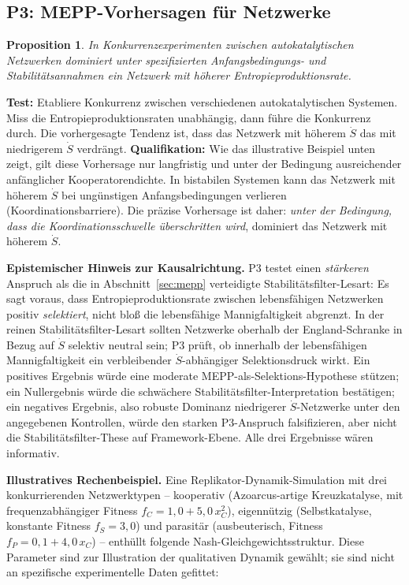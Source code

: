 \documentclass[12pt,a4paper]{article}
\newtheorem{proposition}{Proposition}
\theoremstyle{remark}
\begin{document}
\subsection{P3: MEPP-Vorhersagen für Netzwerke}

\begin{proposition}
In Konkurrenzexperimenten zwischen autokatalytischen Netzwerken dominiert unter spezifizierten Anfangsbedingungs- und Stabilitätsannahmen ein Netzwerk mit höherer Entropieproduktionsrate.
\end{proposition}

\textbf{Test:} Etabliere Konkurrenz zwischen verschiedenen autokatalytischen Systemen. Miss die Entropieproduktionsraten unabhängig, dann führe die Konkurrenz durch. Die vorhergesagte Tendenz ist, dass das Netzwerk mit höherem $\dot{S}$ das mit niedrigerem $\dot{S}$ verdrängt. \textbf{Qualifikation:} Wie das illustrative Beispiel unten zeigt, gilt diese Vorhersage nur langfristig und unter der Bedingung ausreichender anfänglicher Kooperatorendichte. In bistabilen Systemen kann das Netzwerk mit höherem $\dot{S}$ bei ungünstigen Anfangsbedingungen verlieren (Koordinationsbarriere). Die präzise Vorhersage ist daher: \emph{unter der Bedingung, dass die Koordinationsschwelle überschritten wird}, dominiert das Netzwerk mit höherem $\dot{S}$.

\textbf{Epistemischer Hinweis zur Kausalrichtung.} P3 testet einen \emph{stärkeren} Anspruch als die in Abschnitt~\ref{sec:mepp} verteidigte Stabilitätsfilter-Lesart: Es sagt voraus, dass Entropieproduktionsrate zwischen lebensfähigen Netzwerken positiv \emph{selektiert}, nicht bloß die lebensfähige Mannigfaltigkeit abgrenzt. In der reinen Stabilitätsfilter-Lesart sollten Netzwerke oberhalb der England-Schranke in Bezug auf $\dot{S}$ selektiv neutral sein; P3 prüft, ob innerhalb der lebensfähigen Mannigfaltigkeit ein verbleibender $\dot{S}$-abhängiger Selektionsdruck wirkt. Ein positives Ergebnis würde eine moderate MEPP-als-Selektions-Hypothese stützen; ein Nullergebnis würde die schwächere Stabilitätsfilter-Interpretation bestätigen; ein negatives Ergebnis, also robuste Dominanz niedrigerer $\dot{S}$-Netzwerke unter den angegebenen Kontrollen, würde den starken P3-Anspruch falsifizieren, aber nicht die Stabilitätsfilter-These auf Framework-Ebene. Alle drei Ergebnisse wären informativ.

\textbf{Illustratives Rechenbeispiel.} Eine Replikator-Dynamik-Simulation mit drei konkurrierenden Netzwerktypen -- kooperativ (Azoarcus-artige Kreuzkatalyse, mit frequenzabhängiger Fitness $f_C = 1{,}0 + 5{,}0\,x_C^2$), eigennützig (Selbstkatalyse, konstante Fitness $f_S = 3{,}0$) und parasitär (ausbeuterisch, Fitness $f_P = 0{,}1 + 4{,}0\,x_C$) -- enthüllt folgende Nash-Gleichgewichtsstruktur. Diese Parameter sind zur Illustration der qualitativen Dynamik gewählt; sie sind nicht an spezifische experimentelle Daten gefittet:
\end{document}
